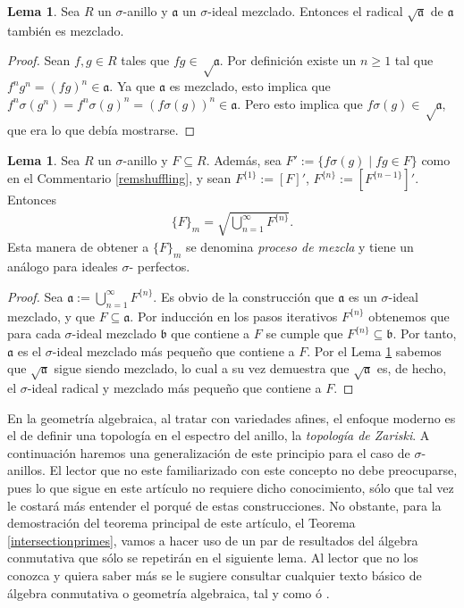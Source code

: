 \documentclass[letterpaper]{article}
\def\a{\mathfrak{a}}
\def\b{\mathfrak{b}}
\def\s{\sigma}
\theoremstyle{definition}
\newtheorem{lem}[Satz]{Lema}
\begin{document}
\begin{lem}\label{sqrtmixed}
Sea $R$ un $\sigma$-anillo y $\a$ un $\sigma$-ideal mezclado. Entonces el radical $\sqrt{\a}$ de $\a$ tambi\'en es mezclado. \end{lem}

\begin{proof}
Sean $f,g \in R$ tales que $fg \in \sqrt \a$. Por definici\'on existe un $n \geq 1$ tal que $f^n g^n = (fg)^n \in \a$. Ya que $\a$ es mezclado, esto implica que $f^n \s(g^n) = f^n \s(g)^n = (f\s(g))^n \in \a$. 
Pero esto implica que $f\s(g) \in \sqrt \a$, que era lo que deb\'ia mostrarse.
\end{proof}


\begin{lem}\label{lemsuffling}
Sea $R$ un $\sigma$-anillo y $F \subseteq R$. Adem\'as, sea $F' := \{f\s(g) \mid fg \in F \}$ como en el Commentario \ref{remshuffling}, y sean $F^{\{1\}}:= [F]'$, $F^{\{n\}}:= [F^{\{n-1\}}]'$. Entonces
\begin{align} \{F\}_m = \sqrt{\bigcup_{n=1}^{\infty} F^{\{n\}}}. \end{align}
Esta manera de obtener a $\{F\}_m$ se denomina \emph{proceso de mezcla} y tiene un an\'alogo para ideales $\sigma$- perfectos. 
\begin{proof}
Sea $\a:= \bigcup_{n=1}^{\infty} F^{\{n\}}$. Es obvio de la construcci\'on que $\a$ es un $\sigma$-ideal mezclado, y que $F \subseteq \a$. 
Por inducci\'on en los pasos iterativos $F^{\{n\}}$ obtenemos que para cada $\sigma$-ideal mezclado $\b$ que contiene a $F$ se cumple que $F^{\{n\}} \subseteq \b$. Por tanto, $\a$ es el $\sigma$-ideal mezclado m\'as peque\~no que contiene a $F$.
Por el Lema \ref{sqrtmixed} sabemos que $\sqrt{\a}$ sigue siendo mezclado, lo cual a su vez demuestra que $\sqrt{\a}$ es, de hecho, el $\sigma$-ideal radical y mezclado m\'as peque\~no que contiene a $F$. 
\end{proof}
\end{lem}

En la geometr\'ia algebraica, al tratar con variedades afines, el enfoque moderno es el de definir una topolog\'ia en el espectro del anillo, la \emph{topolog\'ia de Zariski}. A continuaci\'on haremos una generalizaci\'on de este principio para el caso de $\sigma$-anillos. El lector que no este familiarizado con este concepto no debe preocuparse, 
pues lo que sigue en este art\'iculo no requiere dicho conocimiento, s\'olo que tal vez le costar\'a m\'as entender el porqu\'e de estas construcciones. 
No obstante, para la demostraci\'on del teorema principal de este art\'iculo, el Teorema \ref{intersectionprimes}, vamos a hacer uso de un par de resultados del \'algebra conmutativa
que s\'olo se repetir\'an en el siguiente lema. Al lector que no los conozca y quiera saber m\'as se le sugiere consultar cualquier texto b\'asico de \'algebra conmutativa o geometr\'ia algebraica,
tal y como \cite{eisenbud} \'o \cite{hartshorne}.
\end{document}
